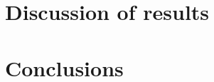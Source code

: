 \documentclass[11pt]{article}
\begin{document}
\section{Discussion of results}


\section{Conclusions}


































 





\end{document}
